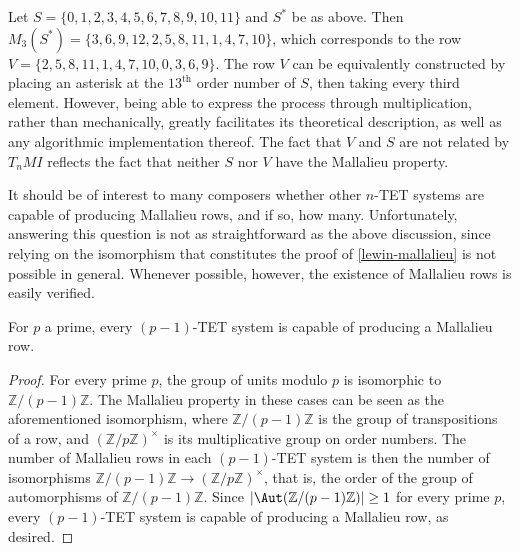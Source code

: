\begin{example}
	Let $S = \{ 0, 1, 2, 3, 4, 5, 6, 7, 8, 9, 10, 11 \}$ and $S^*$ be as above. Then $M_3(S^*) = \{ 3, 6, 9, 12, 2, 5, 8, 11, 1, 4, 7, 10 \}$, which corresponds to the row $V = \{ 2, 5, 8, 11, 1, 4, 7, 10, 0, 3, 6, 9 \}$. The row $V$ can be equivalently constructed by placing an asterisk at the $13^\text{th}$ order number of $S$, then taking every third element. However, being able to express the process through multiplication, rather than mechanically, greatly facilitates its theoretical description, as well as any algorithmic implementation thereof. The fact that $V$ and $S$ are not related by $T_nMI$ reflects the fact that neither $S$ nor $V$ have the Mallalieu property.
\end{example}

\pagebreak
It should be of interest to many composers whether other $n$-TET systems are capable of producing Mallalieu rows, and if so, how many. Unfortunately, answering this question is not as straightforward as the above discussion, since relying on the isomorphism that constitutes the proof of \ref{lewin-mallalieu} is not possible in general. Whenever possible, however, the existence of Mallalieu rows is easily verified.

\begin{proposition}
	\label{lewin-mallalieu}
	\cite[285]{Lewin1966}
	For $p$ a prime, every $(p - 1)$-TET system is capable of producing a Mallalieu row.
	\begin{proof}
		For every prime $p$, the group of units modulo $p$ is isomorphic to $\mathbb{Z} / (p - 1) \mathbb{Z}$. The Mallalieu property in these cases can be seen as the aforementioned isomorphism, where $\mathbb{Z} / (p - 1) \mathbb{Z}$ is the group of transpositions of a row, and $(\mathbb{Z} / p \mathbb{Z})^\times$ is its multiplicative group on order numbers. The number of Mallalieu rows in each $(p - 1)$-TET system is then the number of isomorphisms $\mathbb{Z} / (p - 1) \mathbb{Z} \to (\mathbb{Z} / p \mathbb{Z})^\times$, that is, the order of the group of automorphisms of $\mathbb{Z} / (p - 1) \mathbb{Z}$. Since $|\Aut(\mathbb{Z} / (p - 1) \mathbb{Z})| \geq 1$ for every prime $p$, every $(p - 1)$-TET system is capable of producing a Mallalieu row, as desired.
	\end{proof}
\end{proposition}

